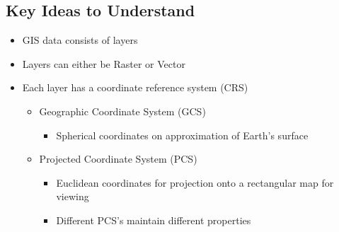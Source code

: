\documentclass[11pt]{article}
\theoremstyle{definition}
\begin{document}
\subsection{Key Ideas to Understand}
\begin{itemize}
    \item GIS data consists of layers
    \item Layers can either be Raster or Vector
    \item Each layer has a coordinate reference system
    (CRS)
    \begin{itemize}
        \item Geographic Coordinate System (GCS)
        \begin{itemize}
            \item Spherical coordinates on approximation of Earth’s surface
        \end{itemize}
        \item Projected Coordinate System (PCS)
        \begin{itemize}
            \item Euclidean coordinates for projection onto a rectangular map
            for viewing
            \item Different PCS’s maintain different properties
        \end{itemize} 
    \end{itemize}
\end{itemize}
\end{document}
